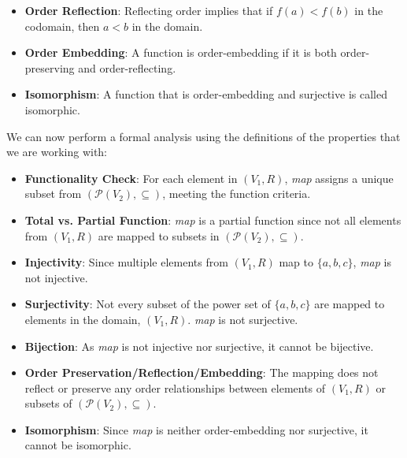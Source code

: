 \documentclass[12pt]{article}
\begin{document}
\begin{spacing}{1.5}
\begin{itemize}
        \item \textbf{Order Reflection}: Reflecting order implies that if $f(a) < f(b)$ in the codomain, then $a < b$ in the domain.
    
        \item \textbf{Order Embedding}: A function is order-embedding if it is both order-preserving and order-reflecting.
    
        \item \textbf{Isomorphism}: A function that is order-embedding and surjective is called isomorphic. 
    \end{itemize}

    \noindent We can now perform a formal analysis using the definitions of the properties that we are working with:

    \begin{itemize}
        \item \textbf{Functionality Check}: For each element in $(V_1, R)$, \textit{map} assigns a unique subset from $(\mathcal{P}(V_2), \subseteq)$, meeting the function criteria.

        \item \textbf{Total vs. Partial Function}: \textit{map} is a partial function since not all elements from $(V_1, R)$ are mapped to subsets in $(\mathcal{P}(V_2), \subseteq)$.

        \item \textbf{Injectivity}: Since multiple elements from $(V_1, R)$ map to $\{a,b,c\}$, \textit{map} is not injective.

        \item \textbf{Surjectivity}: Not every subset of the power set of $\{a,b,c\}$ are mapped to elements in the domain, $(V_1,R)$. \textit{map} is not surjective.

        \item \textbf{Bijection}: As \textit{map} is not injective nor surjective, it cannot be bijective.

        \item \textbf{Order Preservation/Reflection/Embedding}: The mapping does not reflect or preserve any order relationships between elements of $(V_1, R)$ or subsets of $(\mathcal{P}(V_2), \subseteq)$.

        \item \textbf{Isomorphism}: Since \textit{map} is neither order-embedding nor surjective, it cannot be isomorphic.
    \end{itemize}


\end{spacing}
\end{document}

